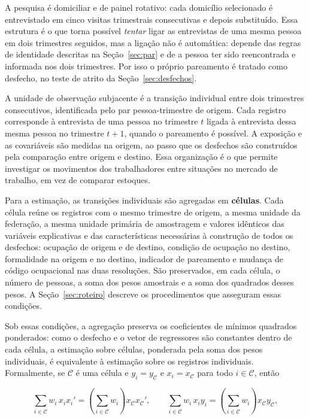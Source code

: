 A pesquisa é domiciliar e de painel rotativo: cada domicílio selecionado é
entrevistado em cinco visitas trimestrais consecutivas e depois substituído.
Essa estrutura é o que torna possível \emph{tentar} ligar as entrevistas de uma
mesma pessoa em dois trimestres seguidos, mas a ligação não é automática:
depende das regras de identidade descritas na Seção~\ref{sec:par} e de a pessoa
ter sido reencontrada e informada nos dois trimestres. Por isso o próprio
pareamento é tratado como desfecho, no teste de atrito da
Seção~\ref{sec:desfechos}.

A unidade de observação subjacente é a transição individual entre dois
trimestres consecutivos, identificada pelo par pessoa-trimestre de origem. Cada
registro corresponde à entrevista de uma pessoa no trimestre $t$ ligada à
entrevista dessa mesma pessoa no trimestre $t+1$, quando o pareamento é
possível. A exposição e as covariáveis são medidas na origem, ao passo que os
desfechos são construídos pela comparação entre origem e destino. Essa
organização é o que permite investigar os movimentos dos trabalhadores entre
situações no mercado de trabalho, em vez de comparar estoques.

Para a estimação, as transições individuais são agregadas em \textbf{células}.
Cada célula reúne os registros com o mesmo trimestre de origem, a mesma unidade
da federação, a mesma unidade primária de amostragem e valores idênticos das
variáveis explicativas e das características necessárias à construção de todos os
desfechos: ocupação de origem e de destino, condição de ocupação no destino,
formalidade na origem e no destino, indicador de pareamento e mudança de código
ocupacional nas duas resoluções. São preservados, em cada célula, o número de
pessoas, a soma dos pesos amostrais e a soma dos quadrados desses pesos. A
Seção~\ref{sec:roteiro} descreve os procedimentos que asseguram essas condições.

Sob essas condições, a agregação preserva os coeficientes de mínimos quadrados
ponderados: como o desfecho e o vetor de regressores são constantes dentro de
cada célula, a estimação sobre células, ponderada pela soma dos pesos
individuais, é equivalente à estimação sobre os registros individuais.
Formalmente, se $\mathcal{C}$ é uma célula e $y_i = y_{\mathcal{C}}$ e
$x_i = x_{\mathcal{C}}$ para todo $i \in \mathcal{C}$, então

\begin{equation}
  \sum_{i \in \mathcal{C}} w_i \, x_i x_i' = \left( \sum_{i \in \mathcal{C}} w_i \right) x_{\mathcal{C}} x_{\mathcal{C}}',
  \qquad
  \sum_{i \in \mathcal{C}} w_i \, x_i y_i = \left( \sum_{i \in \mathcal{C}} w_i \right) x_{\mathcal{C}} y_{\mathcal{C}},
  \label{eq:agregacao}
\end{equation}


